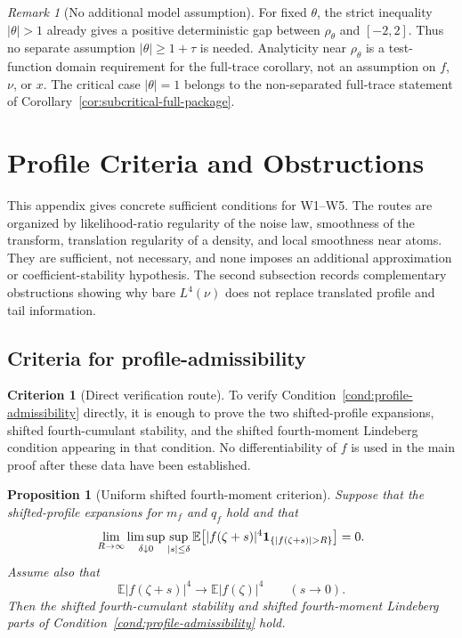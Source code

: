 \documentclass[11pt]{article}
\newtheorem{proposition}[theorem]{Proposition}
\theoremstyle{definition}
\newtheorem{criterion}[theorem]{Criterion}
\theoremstyle{remark}
\newtheorem{remark}[theorem]{Remark}
\newcommand{\E}{\mathbb E}
\begin{document}
\begin{remark}[No additional model assumption]
For fixed \(\theta\), the strict inequality \(|\theta|>1\) already gives a
positive deterministic gap between \(\rho_\theta\) and \([-2,2]\).  Thus no
separate assumption \(|\theta|\ge1+\tau\) is needed.  Analyticity near
\(\rho_\theta\) is a test-function domain requirement for the full-trace
corollary, not an assumption on \(f\), \(\nu\), or \(x\).  The critical case
\(|\theta|=1\) belongs to the non-separated full-trace statement of
Corollary~\ref{cor:subcritical-full-package}.
\end{remark}
\section{Profile Criteria and Obstructions}
\label{app:assumption-W-criteria}

This appendix gives concrete sufficient conditions for W1--W5.  The routes
are organized by likelihood-ratio regularity of the noise law, smoothness of
the transform, translation regularity of a density, and local smoothness near
atoms.  They are sufficient, not necessary, and none imposes an additional
approximation or coefficient-stability hypothesis.  The second subsection
records complementary obstructions showing why bare $L^4(\nu)$ does not
replace translated profile and tail information.

\subsection{Criteria for profile-admissibility}

\begin{criterion}[Direct verification route]
\label{crit:direct-profile-verification}
To verify Condition~\ref{cond:profile-admissibility} directly, it is enough to prove the two shifted-profile expansions, shifted fourth-cumulant stability, and the shifted fourth-moment Lindeberg condition appearing in that condition.  No differentiability of \(f\) is used in the main proof after these data have been established.
\end{criterion}

\begin{proposition}[Uniform shifted fourth-moment criterion]
\label{prop:W-TUI}
Suppose that the shifted-profile expansions for \(m_f\) and \(q_f\) hold and that
\[
\lim_{R\to\infty}\limsup_{\delta\downarrow0}
\sup_{|s|\le\delta}
\E\bigl[|f(\zeta+s)|^4{\bf 1}_{\{|f(\zeta+s)|>R\}}\bigr]=0.
\]
Assume also that
\[
        \E |f(\zeta+s)|^4\longrightarrow \E |f(\zeta)|^4
        \qquad(s\to0).
\]
Then the shifted fourth-cumulant stability and shifted fourth-moment Lindeberg parts of Condition~\ref{cond:profile-admissibility} hold.
\end{proposition}
\end{document}
